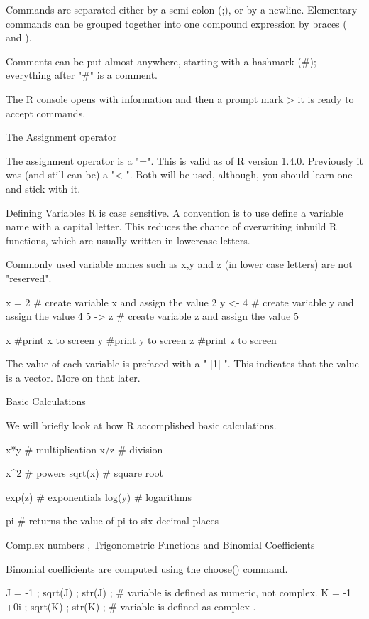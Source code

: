 Commands are separated either by a semi-colon (;), or by a newline. Elementary commands can be grouped together into one compound expression by braces ({ and }). 

Comments can be put almost anywhere, starting with a hashmark (#); everything after "#" is a comment.

The R console opens with information and then a prompt mark  >  it is ready to accept commands.

The Assignment operator

The assignment operator is a "=". This is valid as of R version 1.4.0. Previously it was (and still can be) a "<-".
Both will be used, although, you should learn one and stick with it.

Defining Variables 
R is case sensitive.
A convention is to use define a variable name with a capital letter. This reduces the chance of overwriting inbuild R functions, which are usually written in lowercase letters.

Commonly used variable names such as x,y and z (in lower case letters) are not "reserved".

x = 2           # create variable x and assign the value 2
y <- 4          # create variable y and assign the value 4
5 -> z          # create variable z and assign the value 5

x  #print x to screen
y  #print y to screen
z  #print z to screen

The value of each variable is prefaced with a " [1] ". This indicates that the value is a vector. More on that later.





Basic Calculations

We will briefly look at how R accomplished basic calculations.


x*y			# multiplication
x/z			# division

x^2			# powers
sqrt(x)		# square root

exp(z)		 # exponentials   
log(y)		 # logarithms

pi             # returns the value of pi to six decimal places

 
Complex numbers , Trigonometric  Functions and Binomial Coefficients
 
 
Binomial coefficients are computed using the choose() command.


 

J = -1 ;  sqrt(J)  ;  str(J) ;      # variable is defined as numeric, not complex.
K = -1 +0i ;  sqrt(K)  ;  str(K) ;  # variable is defined as complex .


